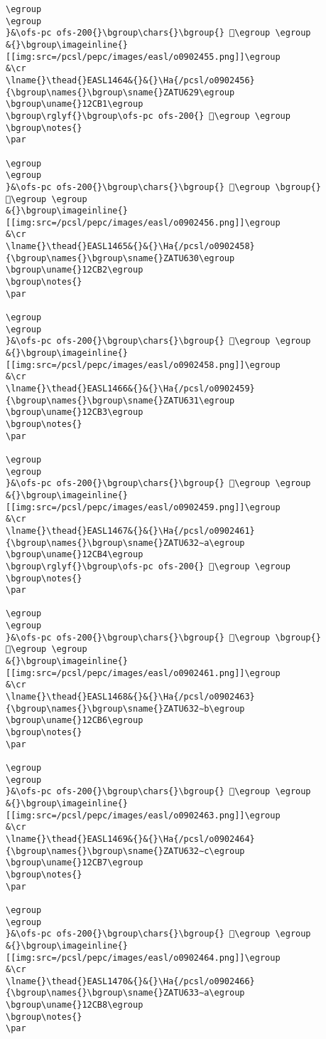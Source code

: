 \begin{verbatim}
\egroup
\egroup
}&\ofs-pc ofs-200{}\bgroup\chars{}\bgroup{} 𒲯\egroup \egroup
&{}\bgroup\imageinline{}[[img:src=/pcsl/pepc/images/easl/o0902455.png]]\egroup
&\cr
\lname{}\thead{}EASL1464&{}&{}\Ha{/pcsl/o0902456}{\bgroup\names{}\bgroup\sname{}ZATU629\egroup
\bgroup\uname{}12CB1\egroup
\bgroup\rglyf{}\bgroup\ofs-pc ofs-200{} 𒲱\egroup \egroup
\bgroup\notes{}
\par 

\egroup
\egroup
}&\ofs-pc ofs-200{}\bgroup\chars{}\bgroup{} 𒲰\egroup \bgroup{} 𒲱\egroup \egroup
&{}\bgroup\imageinline{}[[img:src=/pcsl/pepc/images/easl/o0902456.png]]\egroup
&\cr
\lname{}\thead{}EASL1465&{}&{}\Ha{/pcsl/o0902458}{\bgroup\names{}\bgroup\sname{}ZATU630\egroup
\bgroup\uname{}12CB2\egroup
\bgroup\notes{}
\par 

\egroup
\egroup
}&\ofs-pc ofs-200{}\bgroup\chars{}\bgroup{} 𒲲\egroup \egroup
&{}\bgroup\imageinline{}[[img:src=/pcsl/pepc/images/easl/o0902458.png]]\egroup
&\cr
\lname{}\thead{}EASL1466&{}&{}\Ha{/pcsl/o0902459}{\bgroup\names{}\bgroup\sname{}ZATU631\egroup
\bgroup\uname{}12CB3\egroup
\bgroup\notes{}
\par 

\egroup
\egroup
}&\ofs-pc ofs-200{}\bgroup\chars{}\bgroup{} 𒲳\egroup \egroup
&{}\bgroup\imageinline{}[[img:src=/pcsl/pepc/images/easl/o0902459.png]]\egroup
&\cr
\lname{}\thead{}EASL1467&{}&{}\Ha{/pcsl/o0902461}{\bgroup\names{}\bgroup\sname{}ZATU632∼a\egroup
\bgroup\uname{}12CB4\egroup
\bgroup\rglyf{}\bgroup\ofs-pc ofs-200{} 𒲴\egroup \egroup
\bgroup\notes{}
\par 

\egroup
\egroup
}&\ofs-pc ofs-200{}\bgroup\chars{}\bgroup{} 𒲴\egroup \bgroup{} 𒲵\egroup \egroup
&{}\bgroup\imageinline{}[[img:src=/pcsl/pepc/images/easl/o0902461.png]]\egroup
&\cr
\lname{}\thead{}EASL1468&{}&{}\Ha{/pcsl/o0902463}{\bgroup\names{}\bgroup\sname{}ZATU632∼b\egroup
\bgroup\uname{}12CB6\egroup
\bgroup\notes{}
\par 

\egroup
\egroup
}&\ofs-pc ofs-200{}\bgroup\chars{}\bgroup{} 𒲶\egroup \egroup
&{}\bgroup\imageinline{}[[img:src=/pcsl/pepc/images/easl/o0902463.png]]\egroup
&\cr
\lname{}\thead{}EASL1469&{}&{}\Ha{/pcsl/o0902464}{\bgroup\names{}\bgroup\sname{}ZATU632∼c\egroup
\bgroup\uname{}12CB7\egroup
\bgroup\notes{}
\par 

\egroup
\egroup
}&\ofs-pc ofs-200{}\bgroup\chars{}\bgroup{} 𒲷\egroup \egroup
&{}\bgroup\imageinline{}[[img:src=/pcsl/pepc/images/easl/o0902464.png]]\egroup
&\cr
\lname{}\thead{}EASL1470&{}&{}\Ha{/pcsl/o0902466}{\bgroup\names{}\bgroup\sname{}ZATU633∼a\egroup
\bgroup\uname{}12CB8\egroup
\bgroup\notes{}
\par 


\end{verbatim}
